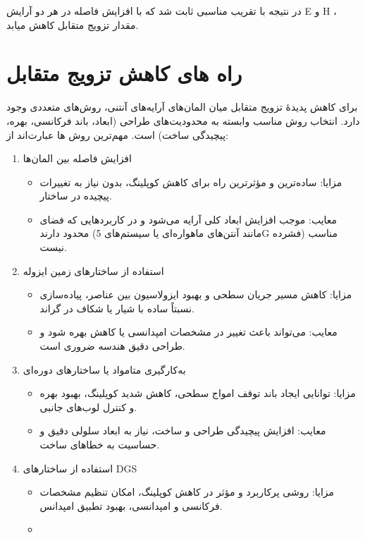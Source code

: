 در نتیجه با تقریب مناسبی ثابت شد که با افزایش فاصله در هر دو آرایش E و H ، مقدار تزویج متقابل کاهش میابد.

\section{راه های کاهش تزویج متقابل}
برای کاهش پدیدهٔ تزویج متقابل میان المان‌های آرایه‌های آنتنی، روش‌های متعددی وجود دارد. انتخاب روش مناسب وابسته به محدودیت‌های طراحی (ابعاد، باند فرکانسی، بهره، پیچیدگی ساخت) است. مهم‌ترین روش ها عبارت‌اند از:
\begin{enumerate}
	\item{
	افزایش فاصله بین المان‌ها
	\begin{itemize}
		\item{
		مزایا:
		 ساده‌ترین و مؤثرترین راه برای کاهش کوپلینگ، بدون نیاز به تغییرات پیچیده در ساختار.
		}
		\item{
		معایب:
		 موجب افزایش ابعاد کلی آرایه می‌شود و در کاربردهایی که فضای محدود دارند (مانند آنتن‌های ماهواره‌ای یا سیستم‌های 5G فشرده) مناسب نیست.
		}
	\end{itemize}
	}
	\item{
	استفاده از ساختارهای زمین ایزوله
	\begin{itemize}
		\item{
			مزایا:
			 کاهش مسیر جریان سطحی و بهبود ایزولاسیون بین عناصر، پیاده‌سازی نسبتاً ساده با شیار یا شکاف در گراند.
		}
		\item{
			معایب:
			می‌تواند باعث تغییر در مشخصات امپدانسی یا کاهش بهره شود و طراحی دقیق هندسه ضروری است.
		}
	\end{itemize}
	}
	\item{
	به‌کارگیری متامواد یا ساختارهای دوره‌ای
	\begin{itemize}
		\item{
			مزایا:
			توانایی ایجاد باند توقف امواج سطحی، کاهش شدید کوپلینگ، بهبود بهره و کنترل لوب‌های جانبی.
		}
		\item{
			معایب:
			افزایش پیچیدگی طراحی و ساخت، نیاز به ابعاد سلولی دقیق و حساسیت به خطاهای ساخت.
		}
	\end{itemize}
	}
	\item{
	استفاده از ساختارهای DGS
	\begin{itemize}
		\item{
			مزایا:
			روشی پرکاربرد و مؤثر در کاهش کوپلینگ، امکان تنظیم مشخصات فرکانسی و امپدانسی، بهبود تطبیق امپدانس.
		}
		\item{
}
\end{itemize}}
\end{enumerate}
